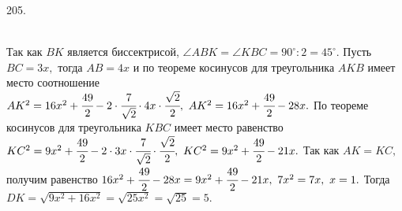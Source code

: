 205. \begin{figure}[ht!]
\end{figure}\\
Так как $BK$ является биссектрисой, $\angle ABK=\angle KBC=90^\circ:2=45^\circ.$ Пусть $BC=3x,$ тогда $AB=4x$ и по теореме косинусов для треугольника $AKB$ имеет место соотношение $AK^2=16x^2+\cfrac{49}{2}-2\cdot\cfrac{7}{\sqrt{2}}\cdot 4x\cdot \cfrac{\sqrt{2}}{2},\ AK^2=16x^2+\cfrac{49}{2}-28x.$ По теореме косинусов для треугольника $KBC$ имеет место равенство $KC^2=9x^2+\cfrac{49}{2}-2\cdot 3x\cdot\cfrac{7}{\sqrt{2}}\cdot \cfrac{\sqrt{2}}{2},\ KC^2=9x^2+\cfrac{49}{2}-21x.$ Так как $AK=KC,$ получим равенство $16x^2+\cfrac{49}{2}-28x=9x^2+\cfrac{49}{2}-21x,\ 7x^2=7x,\ x=1.$ Тогда $DK=\sqrt{9x^2+16x^2}=\sqrt{25x^2}=\sqrt{25}=5.$\\
